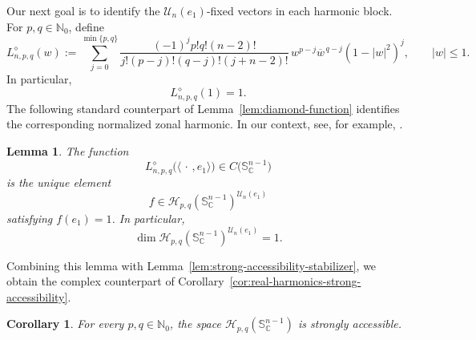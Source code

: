 \documentclass[11pt,showkeys]{amsart}
\newtheorem{lemma}[theorem]{Lemma}
\newtheorem{corollary}[theorem]{Corollary}
\begin{document}
Our next goal is to identify the
\(\mathcal U_n(e_1)\)-fixed vectors in each harmonic block. For
\(p,q\in\mathbb N_0\), define
\[
    L^\diamond_{n,p,q}(w)
    :=
    \sum_{j=0}^{\min\{p,q\}}
    \frac{(-1)^j p!q!(n-2)!}
         {j!(p-j)!(q-j)!(j+n-2)!}\,
    w^{p-j}\overline w^{\,q-j}(1-|w|^2)^j,
    \qquad |w|\leq 1.
\]
In particular,
\[
    L^\diamond_{n,p,q}(1)=1.
\]
The following standard counterpart of
Lemma~\ref{lem:diamond-function} identifies the corresponding
normalized zonal harmonic. In our context, see, for example, \cite[Corollary~4.2]{defant2026ryll}.



\begin{lemma}
\label{lem:complex-diamond-function}
The function
\[
L^\diamond_{n,p,q}\bigl(\langle\,\cdot\,,e_1\rangle\bigr)
\in
C\bigl(\mathbb S_{\mathbb C}^{n-1}\bigr)
\]
is the unique element
\[
    f\in
    \mathcal H_{p,q}(\mathbb S_{\mathbb C}^{n-1})
    ^{\mathcal U_n(e_1)}
\]
satisfying \(f(e_1)=1\). In particular,
\[
    \dim
    \mathcal H_{p,q}(\mathbb S_{\mathbb C}^{n-1})
    ^{\mathcal U_n(e_1)}
    =
    1.
\]
\end{lemma}

Combining this lemma with
Lemma~\ref{lem:strong-accessibility-stabilizer}, we obtain the complex
counterpart of
Corollary~\ref{cor:real-harmonics-strong-accessibility}.

\begin{corollary}
\label{cor:complex-harmonics-strong-accessibility}
For every \(p,q\in\mathbb N_0\), the space
\(
    \mathcal H_{p,q}(\mathbb S_{\mathbb C}^{n-1})
\)
is strongly accessible.
\end{corollary}
\end{document}
